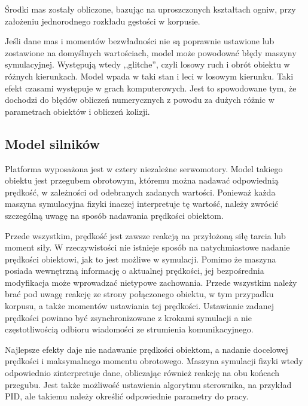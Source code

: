 		Środki mas zostały obliczone, bazując na uproszczonych kształtach ogniw, przy założeniu jednorodnego rozkładu gęstości w korpusie.
		
		Jeśli dane mas i momentów bezwładności nie są poprawnie ustawione lub zostawione na domyślnych wartościach, model może powodować błędy maszyny symulacyjnej.
		Występują wtedy ,,glitche'', czyli losowy ruch i obrót obiektu w różnych kierunkach. Model wpada w taki stan i leci w losowym kierunku. 
		Taki efekt czasami występuje w grach komputerowych. Jest to spowodowane tym, że dochodzi do błędów obliczeń numerycznych z powodu za dużych różnic w parametrach obiektów
		i obliczeń kolizji.
		
	\subsection{Model silników}
		Platforma wyposażona jest w cztery niezależne serwomotory. 
		Model takiego obiektu jest przegubem obrotowym, któremu można nadawać odpowiednią prędkość, w zależności od odebranych zadanych wartości.
		Ponieważ każda maszyna symulacyjna fizyki inaczej interpretuje tę wartość, należy zwrócić szczególną uwagę na sposób nadawania prędkości obiektom.
		
		Przede wszystkim, prędkość jest zawsze reakcją na przyłożoną siłę tarcia lub moment siły. 
		W rzeczywistości nie istnieje sposób na natychmiastowe nadanie prędkości obiektowi, jak to jest możliwe w symulacji.
		Pomimo że maszyna posiada wewnętrzną informację o aktualnej prędkości,
		jej bezpośrednia modyfikacja może wprowadzać nietypowe zachowania. 
		Przede wszystkim należy brać pod uwagę reakcję ze strony połączonego obiektu, w tym przypadku korpusu,
		a także momentów ustawiania tej prędkości.
		Ustawianie zadanej prędkości powinno być zsynchronizowane z krokami symulacji a nie częstotliwością odbioru wiadomości ze strumienia komunikacyjnego.
		
		Najlepsze efekty daje nie nadawanie prędkości obiektom, a nadanie docelowej prędkości i maksymalnego momentu obrotowego.
		Maszyna symulacji fizyki wtedy odpowiednio zinterpretuje dane, obliczając również reakcję na obu końcach przegubu.
		Jest także możliwość ustawienia algorytmu sterownika, na przykład PID, ale takiemu należy określić odpowiednie parametry do pracy.
		
